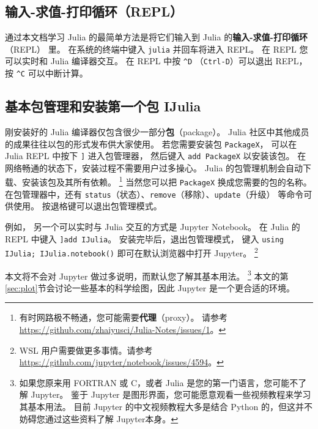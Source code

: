 \documentclass[10pt,a4paper]{article}
\begin{document}
\subsection{输入-求值-打印循环（REPL）}
通过本文档学习 Julia 的最简单方法是将它们输入到 Julia 的\textbf{输入-求值-打印循环}（REPL） 里。
在系统的终端中键入 \lstinline|julia| 并回车将进入 REPL。
在 REPL 您可以实时和 Julia 编译器交互。
在 REPL 中按 \lstinline|^D| （\lstinline|Ctrl-D|）可以退出 REPL，
按 \lstinline|^C| 可以中断计算。

\subsection{基本包管理和安装第一个包 IJulia}

刚安装好的 Julia 编译器仅包含很少一部分\textbf{包}（package）。
Julia 社区中其他成员的成果往往以包的形式发布供大家使用。
若您需要安装包 \lstinline|PackageX|，
可以在 Julia REPL 中按下 \lstinline|]| 进入包管理器，
然后键入 \lstinline|add PackageX| 以安装该包。
在网络畅通的状态下，安装过程不需要用户过多操心。
Julia 的包管理机制会自动下载、安装该包及其所有依赖。
\footnote{
	有时网路极不畅通，您可能需要\textbf{代理}（proxy）。
	请参考 \url{https://github.com/zhaiyusci/Julia-Notes/issues/1}。
}
当然您可以把 \lstinline|PackageX| 换成您需要的包的名称。
在包管理器中，还有 \lstinline|status|（状态）、\lstinline|remove|（移除）、\lstinline|update|（升级） 等命令可供使用。
按退格键可以退出包管理模式。

例如，
另一个可以实时与 Julia 交互的方式是 Jupyter Notebook。
在 Julia 的 REPL 中键入 \lstinline|]add IJulia|。
安装完毕后，退出包管理模式，
键入 \lstinline|using IJulia; IJulia.notebook()| 即可在默认浏览器中打开 Jupyter。
\footnote{
WSL 用户需要做更多事情。请参考 
\url{https://github.com/jupyter/notebook/issues/4594}。
}

本文将不会对 Jupyter 做过多说明，而默认您了解其基本用法。
\footnote{
	如果您原来用 FORTRAN 或 C，或者 Julia 是您的第一门语言，您可能不了解 Jupyter。
	鉴于 Jupyter 是图形界面，您可能愿意观看一些视频教程来学习其基本用法。
	目前 Jupyter 的中文视频教程大多是结合 Python 的，但这并不妨碍您通过这些资料了解 Jupyter本身。
}
本文的第\ref{sec:plot}节会讨论一些基本的科学绘图，因此 Jupyter 是一个更合适的环境。

\end{document}
